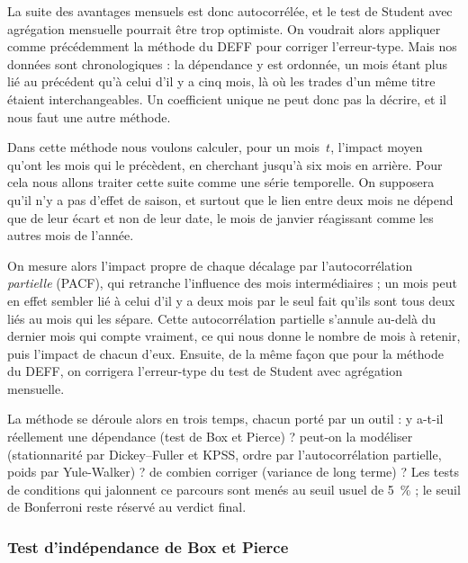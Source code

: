 La suite des avantages mensuels est donc autocorrélée, et le test de Student
avec agrégation mensuelle pourrait être trop optimiste.
On voudrait alors appliquer comme précédemment la méthode du DEFF pour corriger
l'erreur-type. Mais nos données sont chronologiques : la dépendance y est
ordonnée, un mois étant plus lié au précédent qu'à celui d'il y a cinq mois,
là où les trades d'un même titre étaient interchangeables. Un coefficient
unique ne peut donc pas la décrire, et il nous faut une autre méthode.

Dans cette méthode nous voulons calculer, pour un mois~$t$, l'impact moyen
qu'ont les mois qui le précèdent, en cherchant jusqu'à six mois en arrière.
Pour cela nous allons traiter cette suite comme une série temporelle. On
supposera qu'il n'y a pas d'effet de saison, et surtout que le lien entre deux
mois ne dépend que de leur écart et non de leur date, le mois de janvier
réagissant comme les autres mois de l'année.

On mesure alors l'impact propre de chaque décalage par l'autocorrélation
\emph{partielle} (PACF), qui retranche l'influence des mois intermédiaires ; un
mois peut en effet sembler lié à celui d'il y a deux mois par le seul fait
qu'ils sont tous deux liés au mois qui les sépare. Cette autocorrélation
partielle s'annule au-delà du dernier mois qui compte vraiment, ce qui nous
donne le nombre de mois à retenir, puis l'impact de chacun d'eux. Ensuite, de
la même façon que pour la méthode du DEFF, on corrigera l'erreur-type du test
de Student avec agrégation mensuelle.

La méthode se déroule alors en trois temps, chacun porté par un outil :
y a-t-il réellement une dépendance (test de Box et Pierce) ? peut-on la
modéliser (stationnarité par Dickey--Fuller et KPSS, ordre par
l'autocorrélation partielle, poids par Yule-Walker) ? de combien corriger
(variance de long terme) ? Les tests de conditions qui jalonnent ce parcours
sont menés au seuil usuel de 5~\% ; le seuil de Bonferroni reste réservé au
verdict final.

\subsubsection*{Test d'indépendance de Box et Pierce}

